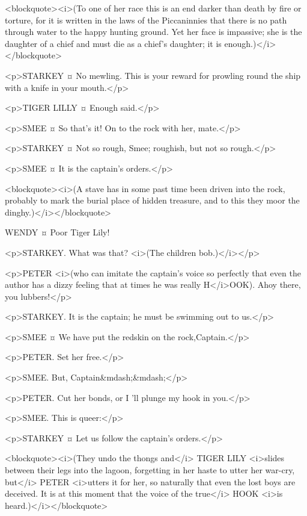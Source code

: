 <blockquote><i>(To one of her race this is an end darker than death by fire or torture, for it is written in the laws of the Piccaninnies that there is no path through water to the happy hunting ground. Yet her face is impassive; she is the daughter of a chief and must die as a chief's daughter; it is enough.)</i></blockquote>

<p>STARKEY ¤
No mewling. This is your reward for prowling round the ship with a knife in your mouth.</p>

<p>TIGER LILLY ¤
Enough said.</p>

<p>SMEE ¤
So that's it! On to the rock with her, mate.</p>

<p>STARKEY ¤
Not so rough, Smee; roughish, but not so rough.</p>

<p>SMEE ¤
It is the captain's orders.</p>

<blockquote><i>(A stave has in some past time been driven into the rock, probably to mark the burial place of hidden treasure, and to this they moor the dinghy.)</i></blockquote>

WENDY ¤
Poor Tiger Lily! 

<p>STARKEY. What was that? <i>(The children bob.)</i></p>

<p>PETER <i>(who can imitate the captain's voice so perfectly that even the author has a dizzy feeling that at times he was really H</i>OOK). Ahoy there, you lubbers!</p>

<p>STARKEY. It is the captain; he must be swimming out to us.</p>

<p>SMEE ¤
We have put the redskin on the rock,Captain.</p>

<p>PETER. Set her free.</p>

<p>SMEE. But, Captain&mdash;&mdash;</p>

<p>PETER. Cut her bonds, or I 'll plunge my hook in you.</p>

<p>SMEE. This is queer:</p>

<p>STARKEY ¤
Let us follow the captain's orders.</p>

<blockquote><i>(They undo the thongs and</i> TIGER LILY <i>slides between their legs into the lagoon, forgetting in her haste to utter her war-cry, but</i> PETER <i>utters it for her, so naturally that even the lost boys are deceived. It is at this moment that the voice of the true</i> HOOK <i>is heard.)</i></blockquote>

